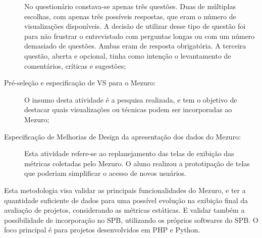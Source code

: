 \begin{description}
    No questionário constava-se apenas três questões. Duas de múltiplas escolhas,
    com apenas três possíveis respostas, que eram o número de visualizações
    disponíveis. A decisão de utilizar desse tipo de questão foi para não
    frustrar o entrevistado com perguntas longas ou com um número demasiado de
    questões. Ambas eram de resposta obrigatória. A terceira questão, aberta e
    opcional, tinha como intenção o levantamento de comentários, críticas e
    sugestões;

  \item [Pré-seleção e especificação de VS para o Mezuro:]
    O insumo desta atividade é a pesquisa realizada, e tem o objetivo de
    destacar quais visualizações ou técnicas podem ser incorporadas ao Mezuro;

  \item [Especificação de Melhorias de Design da apresentação dos dados do Mezuro:]
    Esta atividade refere-se ao replanejamento das telas de exibição das
    métricas coletadas pelo Mezuro. O aluno realizou a prototipação de telas que
    poderiam simplificar o acesso de novos usuários.

\end{description}

Esta metodologia visa validar as principais funcionalidades do Mezuro, e ter a
quantidade suficiente de dados para uma possível evolução na exibição final da
avaliação de projetos, considerando as métricas estáticas. E validar também a
possibilidade de incorporação no SPB, utilizando os próprios softwares do SPB.
O foco principal é para projetos desenvolvidos em PHP e Python.


